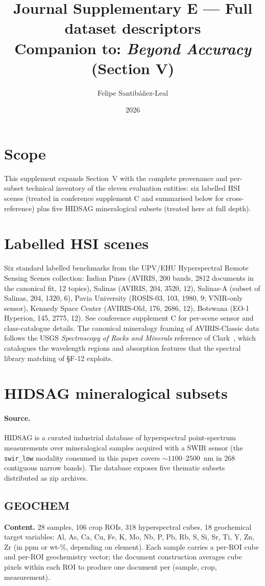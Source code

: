 \documentclass[11pt,a4paper]{article}
\title{Journal Supplementary E --- Full dataset descriptors\\
{\large Companion to: \emph{Beyond Accuracy} (Section V)}}
\author{Felipe Santib\'a\~nez-Leal}
\date{2026}
\begin{document}
\maketitle

\section{Scope}
This supplement expands Section~V with the complete provenance and
per-subset technical inventory of the eleven evaluation entities:
six labelled HSI scenes (treated in conference supplement C and
summarised below for cross-reference) plus five HIDSAG mineralogical
subsets (treated here at full depth).

\section{Labelled HSI scenes}
Six standard labelled benchmarks from the UPV/EHU Hyperspectral
Remote Sensing Scenes collection: Indian Pines (AVIRIS, 200 bands,
2812 documents in the canonical fit, 12 topics), Salinas (AVIRIS,
204, 3520, 12), Salinas-A (subset of Salinas, 204, 1320, 6), Pavia
University (ROSIS-03, 103, 1980, 9; VNIR-only sensor), Kennedy Space
Center (AVIRIS-Old, 176, 2686, 12), Botswana (EO-1 Hyperion, 145,
2775, 12). See conference supplement C for per-scene sensor and
class-catalogue details. The canonical mineralogy framing of
AVIRIS-Classic data follows the USGS \emph{Spectroscopy of Rocks
and Minerals} reference of Clark~\cite{clark1999spectroscopy},
which catalogues the wavelength regions and absorption features
that the spectral library matching of \S{}F-12 exploits.

\section{HIDSAG mineralogical subsets}

\paragraph{Source.} HIDSAG is a curated industrial database of
hyperspectral point-spectrum measurements over mineralogical
samples acquired with a SWIR sensor (the
\texttt{swir\_low} modality consumed in this paper covers
$\sim 1100$--$2500$~nm in 268 contiguous narrow bands). The database
exposes five thematic subsets distributed as zip archives.

\subsection{GEOCHEM}
\textbf{Content.} 28 samples, 106 crop ROIs, 318 hyperspectral
cubes, 18 geochemical target variables: Al, As, Ca, Cu, Fe, K, Mo,
Nb, P, Pb, Rb, S, Si, Sr, Ti, Y, Zn, Zr (in ppm or wt-\%, depending
on element). Each sample carries a per-ROI cube and per-ROI
geochemistry vector; the document construction averages cube pixels
within each ROI to produce one document per (sample, crop,
measurement).
\end{document}
